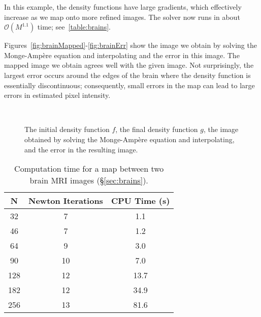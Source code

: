 \documentclass{amsart}
\theoremstyle{lemma}
\theoremstyle{remark}
\begin{document}
In this example, the density functions have large gradients, which effectively increase as we map onto more refined images.  The solver now runs in about ${\mathcal{O}}(M^{1.1})$ time; see~\autoref{table:brains}.

Figures~\ref{fig:brainMapped}-\ref{fig:brainErr} show the image we obtain by solving the {{Monge-Amp\`ere}\xspace} equation and interpolating and the error in this image.   The mapped image we obtain agrees well with the given image.  Not surprisingly, the largest error occurs around the edges of the brain where the density function is essentially discontinuous; consequently, small errors in the map can lead to large errors in estimated pixel intensity.  

\begin{figure}[htdp]
	\centering
         \\
  	\vspace*{-12pt}\caption{ The initial density function $f$,  the final density function $g$,   the image obtained by solving the {{Monge-Amp\`ere}\xspace} equation and interpolating, and  the error in the resulting image.}
  	\label{fig:brains}  	
\end{figure} 

\begin{table}[htdp]\small
\begin{center}
\begin{tabular}{ccc}
N   & Newton Iterations& CPU Time (s)  \\
\hline
32 & 7 & 1.1\\
46 & 7 & 1.2\\
64 & 9 & 3.0\\
90 & 10 & 7.0\\
128 & 12 & 13.7\\
182 & 12 & 34.9\\
256 & 13 & 81.6
\end{tabular}
\end{center}
\caption{Computation time for a map between two brain MRI images (\S\ref{sec:brains}).}
\label{table:brains}
\end{table}
\end{document}
